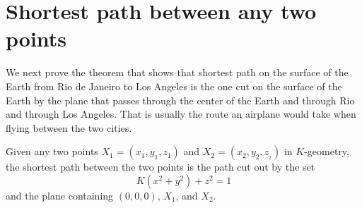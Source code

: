 \documentclass[newpage,hints,handout]{ximera}
\begin{document}
\section{Shortest path between any two points}

We next prove the theorem that shows that shortest path on the surface
of the Earth from Rio de Janeiro to Los Angeles is the one cut on the
surface of the Earth by the plane that passes through the center of
the Earth and through Rio and through Los Angeles. That is usually the
route an airplane would take when flying between the two cities.


\begin{theorem}
Given any two points $X_{1}=\left(x_{1},y_{1},z_{1}\right) $ and
$X_{2}=\left(x_{2},y_{2},z_{_{2}}\right) $ in $K$-geometry, the
shortest path between the two points is the path cut out by the set
\[
K\left(  x^{2}+y^{2}\right)  +z^{2}=1
\]
and the plane containing $(0,0,0)$, $X_{1}$, and $X_{2}$.
\end{theorem}
\end{document}
